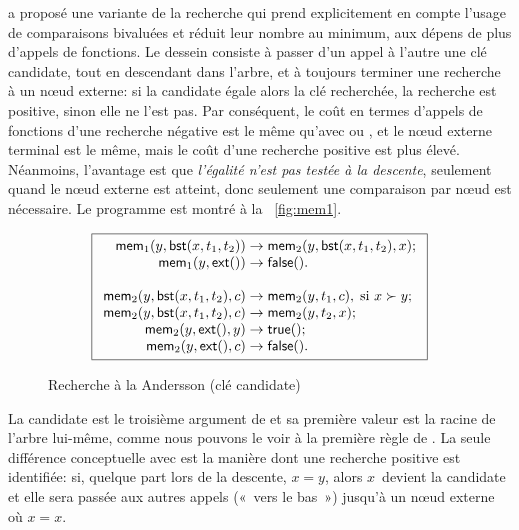 
\cite{Andersson_1991} a proposé une variante de la recherche qui prend
explicitement en compte l'usage de comparaisons bivaluées et réduit
leur nombre au minimum, aux dépens de plus d'appels de fonctions. Le
dessein consiste à passer d'un appel à l'autre une clé candidate, tout
en descendant dans l'arbre, et à toujours terminer une recherche à un
nœud externe: si la candidate égale alors la clé recherchée, la
recherche est positive, sinon elle ne l'est pas. Par conséquent, le
coût en termes d'appels de fonctions d'une recherche négative est le
même qu'avec  ou
, et le nœud externe
terminal est le même, mais le coût d'une recherche positive est plus
élevé. Néanmoins, l'avantage est que \emph{l'égalité n'est pas testée
  à la descente}, seulement quand le nœud externe est atteint,
donc seulement une comparaison par nœud est nécessaire. Le
programme est montré à la \fig~\vref{fig:mem1}.
\begin{figure}
\begin{equation*}
\boxed{
\begin{array}{r@{\;}l@{\;}l}
\fun{mem}_1(y,\fun{bst}(x,t_1,t_2)) & \rightarrow &
  \fun{mem}_2(y,\fun{bst}(x,t_1,t_2),x);\\
\fun{mem}_1(y,\fun{ext}()) & \rightarrow & \fun{false}().\\
\\
\fun{mem}_2(y,\fun{bst}(x,t_1,t_2),c) & \rightarrow &
  \fun{mem}_2(y,t_1,c),\; \text{si \(x \succ y\)};\\
\fun{mem}_2(y,\fun{bst}(x,t_1,t_2),c) & \rightarrow &
  \fun{mem}_2(y,t_2,x);\\
\fun{mem}_2(y,\fun{ext}(),y) & \rightarrow & \fun{true}();\\
\fun{mem}_2(y,\fun{ext}(),c) & \rightarrow & \fun{false}().
\end{array}}
\end{equation*}
\caption{Recherche à la Andersson (clé candidate)}
\label{fig:mem1}
\end{figure}
La candidate est le troisième argument de
 et sa première valeur
est la racine de l'arbre lui-même, comme nous pouvons le voir à la
première règle de . La
seule différence conceptuelle avec
 est la manière dont
une recherche positive est identifiée: si, quelque part lors de la
descente, \(x = y \), alors \(x\)~devient la candidate et elle sera
passée aux autres appels («~vers le bas~») jusqu'à un nœud externe
où \(x = x\).

